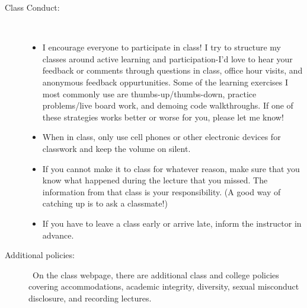 \documentclass [letterpaper,11pt]{article}
\begin{document}
\begin{description}
\item[Class Conduct:] \
   \begin{itemize}\setlength{\itemsep}{0em}\setlength{\parskip}{0pt}
   	\item I encourage everyone to participate in class!  I try to structure my classes around active learning and participation-I'd love to hear your feedback or comments through questions in class, office hour visits, and anonymous feedback oppurtunities.  Some of the learning exercises I most commonly use are thumbs-up/thumbs-down, practice problems/live board work, and demoing code walkthroughs.  If one of these strategies works better or worse for you, please let me know!
			     \item When in class, only use cell phones or other electronic devices for classwork and keep
the volume on silent.
			          \item  If you cannot make it to class for whatever reason, make sure that
       you know what happened during the lecture that you missed. The information from that class is
       your responsibility. (A good way of catching up is to ask a classmate!)
     \item  If you have to leave a class early or arrive late, inform the instructor in
       advance. 
     \end{itemize}
     
\item[Additional policies:] \
On the class webpage, there are additional class and college policies covering accommodations, academic integrity, diversity, sexual misconduct disclosure,
and recording lectures.  
   
   
\end{description}

   
\end{document}
